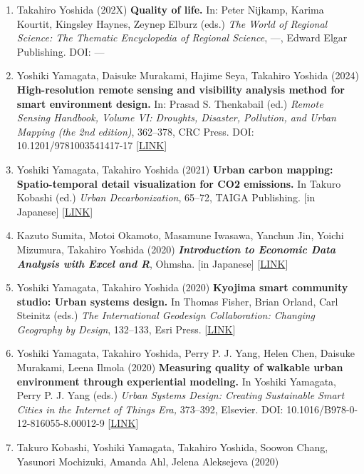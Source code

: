 \documentclass[
]{book}
\providecommand{\tightlist}{%
  \setlength{\itemsep}{0pt}\setlength{\parskip}{0pt}}
\begin{document}
\begin{enumerate}
\def\labelenumi{\arabic{enumi}.}
\tightlist
\item
  Takahiro Yoshida (202X)
  \textbf{Quality of life.}
  In: Peter Nijkamp, Karima Kourtit, Kingsley Haynes, Zeynep Elburz (eds.)
  \emph{The World of Regional Science: The Thematic Encyclopedia of Regional Science}, ---, Edward Elgar Publishing.
  DOI: ---
\item
  Yoshiki Yamagata, Daisuke Murakami, Hajime Seya, Takahiro Yoshida (2024)
  \textbf{High-resolution remote sensing and visibility analysis method for smart environment design.}
  In: Prasad S. Thenkabail (ed.)
  \emph{Remote Sensing Handbook, Volume VI: Droughts, Disaster, Pollution, and Urban Mapping (the 2nd edition)}, 362--378, CRC Press.
  DOI: 10.1201/9781003541417-17 {[}\href{https://doi.org/10.1201/9781003541417-17}{LINK}{]}
\item
  Yoshiki Yamagata, Takahiro Yoshida (2021)
  \textbf{Urban carbon mapping: Spatio-temporal detail visualization for CO2 emissions.}
  In Takuro Kobashi (ed.)
  \emph{Urban Decarbonization}, 65--72, TAIGA Publishing.
  {[}in Japanese{]} {[}\href{https://www.taigashuppan.co.jp/products/detail/552}{LINK}{]}
\item
  Kazuto Sumita, Motoi Okamoto, Masamune Iwasawa, Yanchun Jin, Yoichi Mizumura, Takahiro Yoshida (2020)
  \textbf{\emph{Introduction to Economic Data Analysis with Excel and R}}, Ohmsha.
  {[}in Japanese{]} {[}\href{https://www.ohmsha.co.jp/book/9784274225628/}{LINK}{]}
\item
  Yoshiki Yamagata, Takahiro Yoshida (2020)
  \textbf{Kyojima smart community studio: Urban systems design.}
  In Thomas Fisher, Brian Orland, Carl Steinitz (eds.)
  \emph{The International Geodesign Collaboration: Changing Geography by Design}, 132--133, Esri Press.
  {[}\href{https://esripress.esri.com/display/index.cfm?fuseaction=display&websiteID=388&moduleID=0}{LINK}{]}
\item
  Yoshiki Yamagata, Takahiro Yoshida, Perry P. J. Yang, Helen Chen, Daisuke Murakami, Leena Ilmola (2020)
  \textbf{Measuring quality of walkable urban environment through experiential modeling.}
  In Yoshiki Yamagata, Perry P. J. Yang (eds.)
  \emph{Urban Systems Design: Creating Sustainable Smart Cities in the Internet of Things Era,} 373--392, Elsevier.
  DOI: 10.1016/B978-0-12-816055-8.00012-9 {[}\href{https://www.elsevier.com/books/urban-systems-design/yamagata/978-0-12-816055-8}{LINK}{]}
\item
  Takuro Kobashi, Yoshiki Yamagata, Takahiro Yoshida, Soowon Chang, Yasunori Mochizuki, Amanda Ahl, Jelena Aleksejeva (2020)

\end{enumerate}
\end{document}
